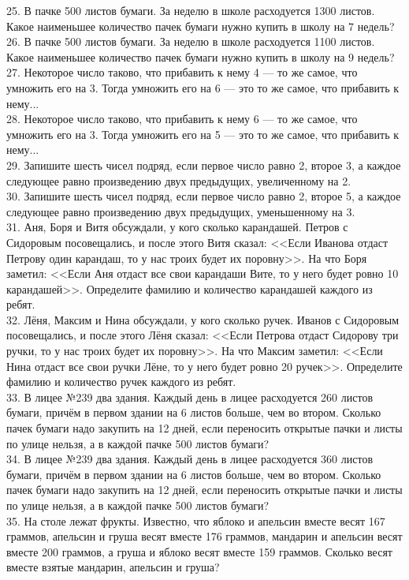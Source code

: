 25. В пачке 500 листов бумаги. За неделю в школе расходуется 1300 листов. Какое наименьшее количество пачек бумаги нужно купить в школу на 7 недель?\\
26. В пачке 500 листов бумаги. За неделю в школе расходуется 1100 листов. Какое наименьшее количество пачек бумаги нужно купить в школу на 9 недель?\\
27. Некоторое число таково, что прибавить к нему 4 --- то же самое, что умножить его на 3. Тогда умножить его на 6 --- это то же самое, что прибавить к нему...\\
28. Некоторое число таково, что прибавить к нему 6 --- то же самое, что умножить его на 3. Тогда умножить его на 5 --- это то же самое, что прибавить к нему...\\
29. Запишите шесть чисел подряд, если первое число равно 2, второе 3, а каждое следующее равно произведению двух предыдущих, увеличенному на 2.\\
30. Запишите шесть чисел подряд, если первое число равно 2, второе 5, а каждое следующее равно произведению двух предыдущих, уменьшенному на 3.\\
31. Аня, Боря и Витя обсуждали, у кого сколько карандашей. Петров с Сидоровым посовещались, и после этого Витя сказал: <<Если Иванова отдаст Петрову один карандаш, то у нас троих будет их поровну>>. На что Боря заметил: <<Если Аня отдаст все свои карандаши Вите, то у него будет ровно 10 карандашей>>. Определите фамилию и количество карандашей каждого из ребят.\\
32. Лёня, Максим и Нина обсуждали, у кого сколько ручек. Иванов с Сидоровым посовещались, и после этого Лёня сказал: <<Если Петрова отдаст Сидорову три ручки, то у нас троих будет их поровну>>. На что Максим заметил: <<Если Нина отдаст все свои ручки Лёне, то у него будет ровно 20 ручек>>. Определите фамилию и количество ручек каждого из ребят.\\
33. В лицее №239 два здания. Каждый день в лицее расходуется 260 листов бумаги, причём в первом здании на 6 листов больше, чем во втором. Сколько пачек бумаги надо закупить на 12 дней, если переносить открытые пачки и листы по улице нельзя, а в каждой пачке 500 листов бумаги?\\
34. В лицее №239 два здания. Каждый день в лицее расходуется 360 листов бумаги, причём в первом здании на 6 листов больше, чем во втором. Сколько пачек бумаги надо закупить на 12 дней, если переносить открытые пачки и листы по улице нельзя, а в каждой пачке 500 листов бумаги?\\
35. На столе лежат фрукты. Известно, что яблоко и апельсин вместе весят 167 граммов, апельсин и груша весят вместе 176 граммов, мандарин и апельсин весят вместе 200 граммов, а груша и яблоко весят вместе 159 граммов. Сколько весят вместе взятые мандарин, апельсин и груша?\\
